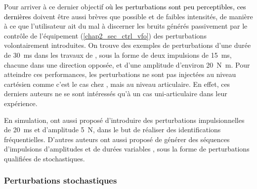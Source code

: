 Pour arriver à ce dernier objectif \textcolor{black}{où les perturbations sont peu perceptibles, ces dernières} doivent être aussi brèves que possible et de faibles intensités, de manière à ce que l'utilisateur ait du mal à discerner les bruits générés passivement par le contrôle de l'équipement (\cref{chap2_sec_ctrl_vfo}) des perturbations volontairement introduites. On trouve des exemples de perturbations d'une durée de \SI{30}{\milli\second} dans les travaux de \textcite{popescu_elbow_2003}, sous la forme de deux impulsions de \SI{15}{\milli\second}, chacune dans une direction opposée, et d'une amplitude d'environ \SI{20}{\newton\meter}. Pour atteindre ces performances, les perturbations ne sont pas injectées au niveau cartésien comme c'est le cas chez \textcite{erden_hand_2015}, mais au niveau articulaire. En effet, ces derniers auteurs ne se sont intéressés qu'à un cas uni-articulaire dans leur expérience.

En simulation, \textcite{piovesan_measuring_2012} ont aussi proposé d'introduire des perturbations impulsionnelles de \SI{20}{\milli\second} et d'amplitude \SI{5}{\newton}, dans le but de réaliser des identifications fréquentielles. D'autres auteurs ont aussi proposé de générer des séquences d'impulsions d'amplitudes et de durées variables \parencite{lacquaniti_time-varying_1993}, sous la forme de perturbations qualifiées de stochastiques.



\subsubsection{Perturbations stochastiques} \label{chap3_sec_st_art_sub_pert_2}

